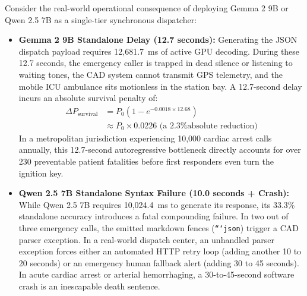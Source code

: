 \documentclass[journal,compsoc]{IEEEtran}
\begin{document}
Consider the real-world operational consequence of deploying Gemma 2 9B or Qwen 2.5 7B as a single-tier synchronous dispatcher:
\begin{itemize}
    \item \textbf{Gemma 2 9B Standalone Delay (12.7 seconds):} Generating the JSON dispatch payload requires 12,681.7~ms of active GPU decoding. During these 12.7 seconds, the emergency caller is trapped in dead silence or listening to waiting tones, the CAD system cannot transmit GPS telemetry, and the mobile ICU ambulance sits motionless in the station bay. A 12.7-second delay incurs an absolute survival penalty of:
    \begin{equation}
    \begin{aligned}
    \Delta P_{\text{survival}} &= P_0 \left(1 - e^{-0.0018 \times 12.68}\right) \\
    &\approx P_0 \times 0.0226 \text{ (a 2.3\% absolute reduction)}
    \end{aligned}
    \end{equation}
    In a metropolitan jurisdiction experiencing 10,000 cardiac arrest calls annually, this 12.7-second autoregressive bottleneck directly accounts for over 230 preventable patient fatalities before first responders even turn the ignition key.
    \item \textbf{Qwen 2.5 7B Standalone Syntax Failure (10.0 seconds + Crash):} While Qwen 2.5 7B requires 10,024.4~ms to generate its response, its 33.3\% standalone accuracy introduces a fatal compounding failure. In two out of three emergency calls, the emitted markdown fences (\texttt{```json}) trigger a CAD parser exception. In a real-world dispatch center, an unhandled parser exception forces either an automated HTTP retry loop (adding another 10 to 20 seconds) or an emergency human fallback alert (adding 30 to 45 seconds). In acute cardiac arrest or arterial hemorrhaging, a 30-to-45-second software crash is an inescapable death sentence.
\end{itemize}
\end{document}
